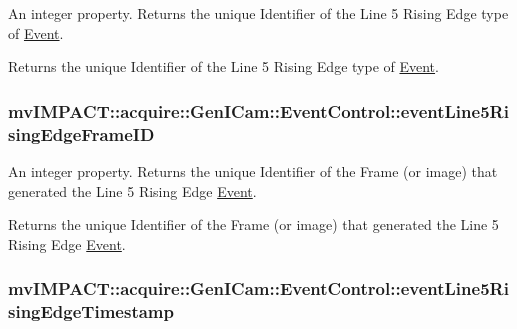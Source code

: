 An integer property. Returns the unique Identifier of the Line 5 Rising Edge type of \hyperlink{classmv_i_m_p_a_c_t_1_1acquire_1_1_event}{Event}. 

Returns the unique Identifier of the Line 5 Rising Edge type of \hyperlink{classmv_i_m_p_a_c_t_1_1acquire_1_1_event}{Event}. \hypertarget{classmv_i_m_p_a_c_t_1_1acquire_1_1_gen_i_cam_1_1_event_control_a3248150efcf40afe45c1f0c171f0d738}{
\subsubsection[{event\+Line5\+Rising\+Edge\+Frame\+I\+D}]{ mv\+I\+M\+P\+A\+C\+T\+::acquire\+::\+Gen\+I\+Cam\+::\+Event\+Control\+::event\+Line5\+Rising\+Edge\+Frame\+I\+D}}\label{classmv_i_m_p_a_c_t_1_1acquire_1_1_gen_i_cam_1_1_event_control_a3248150efcf40afe45c1f0c171f0d738}


An integer property. Returns the unique Identifier of the Frame (or image) that generated the Line 5 Rising Edge \hyperlink{classmv_i_m_p_a_c_t_1_1acquire_1_1_event}{Event}. 

Returns the unique Identifier of the Frame (or image) that generated the Line 5 Rising Edge \hyperlink{classmv_i_m_p_a_c_t_1_1acquire_1_1_event}{Event}. \hypertarget{classmv_i_m_p_a_c_t_1_1acquire_1_1_gen_i_cam_1_1_event_control_a8ff5c8f8c049ba21b4536505c8a9ae9e}{
\subsubsection[{event\+Line5\+Rising\+Edge\+Timestamp}]{ mv\+I\+M\+P\+A\+C\+T\+::acquire\+::\+Gen\+I\+Cam\+::\+Event\+Control\+::event\+Line5\+Rising\+Edge\+Timestamp}}\label{classmv_i_m_p_a_c_t_1_1acquire_1_1_gen_i_cam_1_1_event_control_a8ff5c8f8c049ba21b4536505c8a9ae9e}


